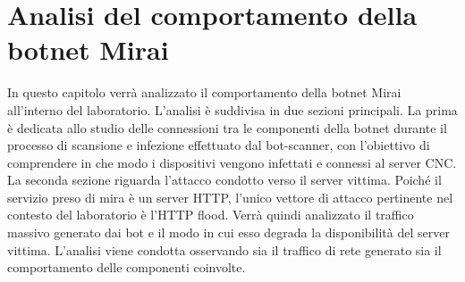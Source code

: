 \chapter{Analisi del comportamento della botnet Mirai}
In questo capitolo verrà analizzato il comportamento della botnet Mirai all'interno del laboratorio. L'analisi è suddivisa in due sezioni principali. La prima è dedicata allo studio delle connessioni tra le componenti della botnet durante il processo di scansione e infezione effettuato dal bot-scanner, con l'obiettivo di comprendere in che modo i dispositivi vengono infettati e connessi al server CNC. La seconda sezione riguarda l'attacco condotto verso il server vittima. Poiché il servizio preso di mira è un server HTTP, l'unico vettore di attacco pertinente nel contesto del laboratorio è l'HTTP flood. Verrà quindi analizzato il traffico massivo generato dai bot e il modo in cui esso degrada la disponibilità del server vittima. L’analisi viene condotta osservando sia il traffico di rete generato sia il comportamento delle componenti coinvolte.
